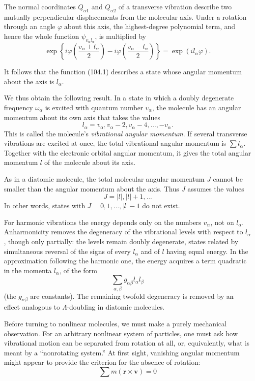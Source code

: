 The normal coordinates $Q_{\alpha1}$ and $Q_{\alpha2}$ of a transverse vibration describe two mutually perpendicular displacements from the molecular axis. Under a rotation through an angle $\varphi$ about this axis, the highest-degree polynomial term, and hence the whole function $\psi_{v_\alpha l_\alpha}$, is multiplied by
\[
 \exp\left\{i\varphi\left(\frac{v_\alpha+l_\alpha}{2}\right)
 -i\varphi\left(\frac{v_\alpha-l_\alpha}{2}\right)\right\}
 =\exp(il_\alpha\varphi).
\]

It follows that the function (104.1) describes a state whose angular momentum about the axis is $l_\alpha$.

We thus obtain the following result. In a state in which a doubly degenerate frequency $\omega_\alpha$ is excited with quantum number $v_\alpha$, the molecule has an angular momentum about its own axis that takes the values
\begin{equation}
 l_\alpha=v_\alpha,v_\alpha-2,v_\alpha-4,\ldots,-v_\alpha.
 \tag{104.2}
\end{equation}
This is called the molecule's \emph{vibrational angular momentum}. If several transverse vibrations are excited at once, the total vibrational angular momentum is $\sum l_\alpha$. Together with the electronic orbital angular momentum, it gives the total angular momentum $l$ of the molecule about its axis.

As in a diatomic molecule, the total molecular angular momentum $J$ cannot be smaller than the angular momentum about the axis. Thus $J$ assumes the values
\[
 J=|l|,|l|+1,\ldots
\]
In other words, states with $J=0,1,\ldots,|l|-1$ do not exist.

For harmonic vibrations the energy depends only on the numbers $v_\alpha$, not on $l_\alpha$. Anharmonicity removes the degeneracy of the vibrational levels with respect to $l_\alpha$, though only partially: the levels remain doubly degenerate, states related by simultaneous reversal of the signs of every $l_\alpha$ and of $l$ having equal energy. In the approximation following the harmonic one, the energy acquires a term quadratic in the momenta $l_\alpha$, of the form
\[
 \sum_{\alpha,\beta}g_{\alpha\beta}l_\alpha l_\beta
\]
(the $g_{\alpha\beta}$ are constants). The remaining twofold degeneracy is removed by an effect analogous to $\Lambda$-doubling in diatomic molecules.

Before turning to nonlinear molecules, we must make a purely mechanical observation. For an arbitrary nonlinear system of particles, one must ask how vibrational motion can be separated from rotation at all, or, equivalently, what is meant by a ``nonrotating system.'' At first sight, vanishing angular momentum might appear to provide the criterion for the absence of rotation:
\begin{equation}
 \sum m(\mathbf r\times\mathbf v)=0
 \tag{104.3}
\end{equation}

